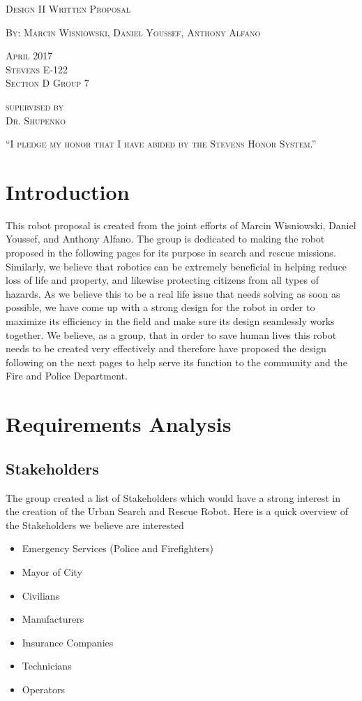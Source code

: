 \documentclass{article}
\begin{document}
\begin{titlepage}
    \centering
	{\scshape\LARGE Design II Written Proposal\par}
	\vspace{1cm}
	{\scshape By: Marcin Wisniowski, Daniel Youssef, Anthony Alfano \par}
	\vfill
	{\scshape April 2017\\Stevens E-122\\Section D Group 7\par}
	\vspace{.5cm}
	{\scshape supervised by \\Dr. Shupenko \par}
    \vfill
	{\scshape “I pledge my honor that I have abided by the Stevens Honor System.”\par}
\end{titlepage}

\tableofcontents
\newpage
\section{Introduction}
This robot proposal is created from the joint efforts of Marcin Wisniowski, Daniel Youssef, and Anthony Alfano. The group is dedicated to making the robot proposed in the following pages for its purpose in search and rescue missions. Similarly, we believe that robotics can be extremely beneficial in helping reduce loss of life and property, and likewise protecting citizens from all types of hazards. As we believe this to be a real life issue that needs solving as soon as possible, we have come up with a strong design for the robot in order to maximize its efficiency in the field and make sure its design seamlessly works together. We believe, as a group, that in order to save human lives this robot needs to be created very effectively and therefore have proposed the design following on the next pages to help serve its function to the community and the Fire and Police Department. 

\section{Requirements Analysis}
\subsection{Stakeholders}
The group created a list of Stakeholders which would have a strong interest in the creation of the Urban Search and Rescue Robot. Here is a quick overview of the Stakeholders we believe are interested
\begin{itemize}
    \item Emergency Services (Police and Firefighters)
    \item Mayor of City
    \item Civilians
    \item Manufacturers
    \item Insurance Companies
    \item Technicians
    \item Operators
\end{itemize}
\end{document}
